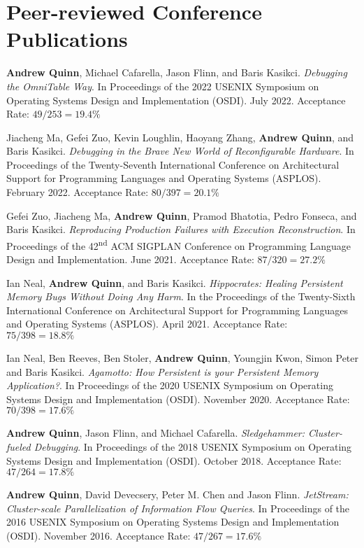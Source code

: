 \documentclass[letterpaper,10pt]{article}
\newcommand{\paper}[3]{#1. #2 #3}
\begin{document}
\section{Peer-reviewed Conference Publications}
\begin{smenumerate}
\item \paper{\textbf{Andrew Quinn}, Michael Cafarella, Jason Flinn,
  and Baris Kasikci}{\emph{Debugging the OmniTable Way}.  In
  Proceedings of the 2022 USENIX Symposium on Operating Systems Design
  and Implementation (OSDI).  July 2022.}{Acceptance Rate:
  $49/253=19.4\%$}
\item \paper{Jiacheng Ma, Gefei Zuo, Kevin Loughlin, Haoyang Zhang,
  \textbf{Andrew Quinn}, and Baris Kasikci}{\emph{Debugging in the
  Brave New World of Reconfigurable Hardware}. In Proceedings of the
  Twenty-Seventh International Conference on Architectural Support for
  Programming Languages and Operating Systems (ASPLOS). February
  2022.}{Acceptance Rate: $80/397=20.1\%$}
  \item \paper{Gefei Zuo, Jiacheng Ma, \textbf{Andrew Quinn}, Pramod
    Bhatotia, Pedro Fonseca, and Baris Kasikci}{\emph{Reproducing
    Production Failures with Execution Reconstruction}. In Proceedings
    of the 42\textsuperscript{nd} ACM SIGPLAN Conference on
    Programming Language Design and Implementation. June
    2021.}{Acceptance Rate: $87/320=27.2\%$}
  \item \paper{Ian Neal, \textbf{Andrew Quinn}, and Baris
    Kasikci}{\emph{Hippocrates: Healing Persistent Memory Bugs Without
    Doing Any Harm}. In the Proceedings of the Twenty-Sixth
    International Conference on Architectural Support for Programming
    Languages and Operating Systems (ASPLOS). April 2021.}{Acceptance
    Rate: $75/398=18.8\%$}
  \item \paper{Ian Neal, Ben Reeves, Ben Stoler, \textbf{Andrew Quinn}, Youngjin Kwon,
    Simon Peter and Baris Kasikci}{\emph{Agamotto: How Persistent is your
    Persistent Memory Application?}.  In Proceedings of the 2020 USENIX
    Symposium on Operating Systems Design and Implementation (OSDI).  November
    2020.}{Acceptance Rate: $70/398=17.6\%$}
  \item \paper{\textbf{Andrew Quinn}, Jason Flinn, and Michael Cafarella}{
    \emph{Sledgehammer: Cluster-fueled Debugging}.  In Proceedings of the 2018
    USENIX Symposium on Operating Systems Design and Implementation (OSDI).
    October 2018.}{Acceptance Rate: $47/264 = 17.8\%$}
  \item \paper{\textbf{Andrew Quinn}, David Devecsery, Peter M. Chen and Jason
    Flinn}{\emph{JetStream: Cluster-scale Parallelization of Information
    Flow Queries}.  In Proceedings of the 2016 USENIX Symposium on
    Operating Systems Design and Implementation (OSDI). November
    2016.}{Acceptance Rate: $47/267=17.6\%$}
\end{smenumerate}
\end{document}
